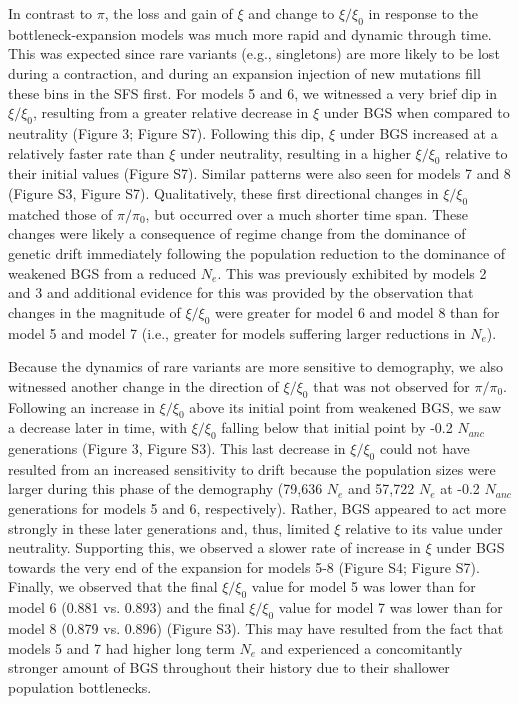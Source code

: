 \documentclass[9pt,twocolumn,twoside]{rilabRxiv}
\begin{document}
In contrast to $\pi$, the loss and gain of $\xi$ and change to
$\xi/\xi_0$ in response to the bottleneck-expansion models was
much more rapid and dynamic through time. This was expected since rare
variants (e.g., singletons) are more likely to be lost during a
contraction, and during an expansion injection of new mutations fill
these bins in the SFS first. For models 5 and 6, we witnessed a very
brief dip in $\xi/\xi_0$, resulting from a greater relative
decrease in $\xi$ under BGS when compared to neutrality (Figure 3; Figure
S7). Following this dip, $\xi$ under BGS increased at a relatively faster
rate than $\xi$ under neutrality, resulting in a higher $\xi/\xi_0$
relative to their initial values (Figure S7). Similar patterns were also
seen for models 7 and 8 (Figure S3, Figure S7). Qualitatively, these
first directional changes in $\xi/\xi_0$ matched those of
$\pi/\pi_0$, but occurred over a much shorter time span. These
changes were likely a consequence of regime change from the dominance of
genetic drift immediately following the population reduction to the
dominance of weakened BGS from a reduced $N_e$. This
was previously exhibited by models 2 and 3 and additional evidence for
this was provided by the observation that changes in the magnitude of
$\xi/\xi_0$ were greater for model 6 and model 8 than for model
5 and model 7 (i.e., greater for models suffering larger reductions in
$N_e$).

Because the dynamics of rare variants are more sensitive to demography,
we also witnessed another change in the direction of
$\xi/\xi_0$ that was not observed for $\pi/\pi_0$.
Following an increase in $\xi/\xi_0$ above its initial point
from weakened BGS, we saw a decrease later in time, with
$\xi/\xi_0$ falling below that initial point by -0.2
$N_{anc}$ generations (Figure 3, Figure S3). This last
decrease in $\xi/\xi_0$ could not have resulted from an
increased sensitivity to drift because the population sizes were larger
during this phase of the demography (79,636 $N_e$
and 57,722 $N_e$ at -0.2 $N_{anc}$
generations for models 5 and 6, respectively). Rather, BGS appeared to
act more strongly in these later generations and, thus, limited $\xi$
relative to its value under neutrality. Supporting this, we observed a
slower rate of increase in $\xi$ under BGS towards the very end of the
expansion for models 5-8 (Figure S4; Figure S7). Finally, we observed
that the final $\xi/\xi_0$ value for model 5 was lower than for
model 6 (0.881 vs. 0.893) and the final $\xi/\xi_0$ value for
model 7 was lower than for model 8 (0.879 vs. 0.896) (Figure S3). This
may have resulted from the fact that models 5 and 7 had higher long term
$N_e$ and experienced a concomitantly stronger
amount of BGS throughout their history due to their shallower population
bottlenecks.
\end{document}
